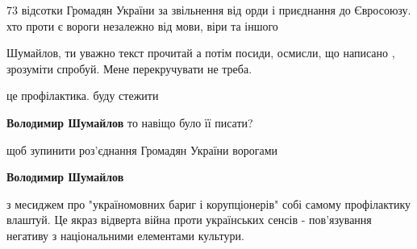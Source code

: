 \begin{itemize}
\begin{itemize}
 

73 відсотки Громадян України за звільнення від орди і приєднання до Євросоюзу.
хто проти є вороги незалежно від мови, віри та іншого

 
Шумайлов, ти уважно текст прочитай а потім посиди, осмисли, що написано , зрозуміти спробуй. Мене перекручувати не треба.

 
це профілактика. буду стежити

 
\textbf{Володимир Шумайлов} то навіщо було її писати?

 
щоб зупинити роз'єднання Громадян України ворогами

 
\textbf{Володимир Шумайлов} 

з месиджем про "україномовних бариг і корупціонерів" собі самому профілактику
влаштуй. Це якраз відверта війна проти українських сенсів - пов'язування
негативу з національними елементами культури.


\end{itemize}
\end{itemize}
